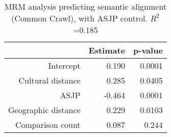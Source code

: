 \begin{table}[ht]
\centering
\begin{tabular}{rrr}
  \hline
 & Estimate & p-value \\ 
  \hline
Intercept & 0.190 & 0.0001 \\ 
  Cultural distance & 0.285 & 0.0405 \\ 
  ASJP & -0.464 & 0.0001 \\ 
  Geographic distance & 0.229 & 0.0103 \\ 
  Comparison count & 0.087 & 0.244 \\ 
   \hline
\end{tabular}
\caption{MRM analysis predicting semantic alignment (Common Crawl), with ASJP control. $R^2$=0.185} 
\end{table}
